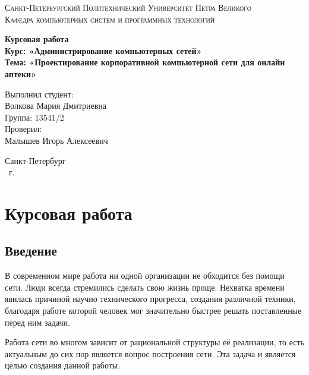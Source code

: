 \documentclass[14pt,a4paper,report]{report}
\begin{document}
\def\contentsname{Содержание}

\begin{titlepage}
	\begin{center}
		\textsc{Санкт-Петербургский Политехнический 
			Университет Петра Великого\\[5mm]
			Кафедра компьютерных систем и программных технологий}
		
		\vfill
		
		\textbf{Курсовая работа\\[3mm]
			Курс: «Администрирование компьютерных сетей»\\[3mm]
			Тема: «Проектирование корпоративной компьютерной сети для онлайн аптеки»\\[35mm]
			}
	\end{center}
	
	\hfill
	\begin{minipage}{.5\textwidth}
		Выполнил студент:\\[2mm] 
		Волкова Мария Дмитриевна\\
		Группа: 13541/2\\[5mm]
		
		Проверил:\\[2mm] 
		Малышев Игорь Алексеевич
	\end{minipage}
	\vfill
	\begin{center}
		Санкт-Петербург\\ \the\year\ г.
	\end{center}
\end{titlepage}

\tableofcontents
\clearpage

\chapter{Курсовая работа}
\section{Введение}

В современном мире работа ни одной организации не обходится без помощи сети. Люди
всегда стремились сделать свою жизнь проще. Нехватка времени явилась причиной
научно технического прогресса, создания различной техники, благодаря работе
которой человек мог значительно быстрее решать поставленные перед ним задачи.

Работа сети во многом зависит от рациональной структуры её реализации, то есть актуальным до сих пор является вопрос построения сети. Эта задача и является целью создания данной работы.
\end{document}
